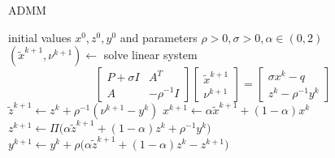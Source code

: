 \documentclass{article}
\begin{document}

\begin{algorithm}[H]
\caption{ADMM}
\label{alg:algorithm1}
\begin{algorithmic}[1]
\Require initial values $x^0, z^0, y^0$ and parameters $\rho > 0, \sigma > 0, \alpha \in (0, 2)$
\Repeat
    \State $(\tilde{x}^{k+1}, \nu^{k+1}) \gets$ solve linear system
    \[
    \begin{bmatrix}
        P + \sigma I & A^T \\
        A & -\rho^{-1} I
    \end{bmatrix}
    \begin{bmatrix}
        \tilde{x}^{k+1} \\
        \nu^{k+1}
    \end{bmatrix}
    =
    \begin{bmatrix}
        \sigma x^k - q \\
        z^k - \rho^{-1} y^k
    \end{bmatrix}
    \]
    \State $\tilde{z}^{k+1} \gets z^k + \rho^{-1} (\nu^{k+1} - y^k)$
    \State $x^{k+1} \gets \alpha \tilde{x}^{k+1} + (1 - \alpha)x^k$
    \State $z^{k+1} \gets \Pi \big( \alpha \tilde{z}^{k+1} + (1 - \alpha)z^k + \rho^{-1} y^k \big)$
    \State $y^{k+1} \gets y^k + \rho \big( \alpha \tilde{z}^{k+1} + (1 - \alpha)z^k - z^{k+1} \big)$
\end{algorithmic}
\end{algorithm}


\end{document}
